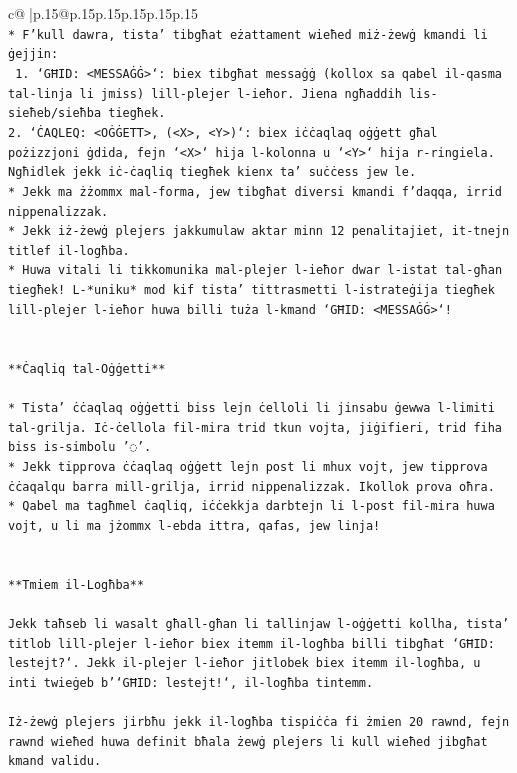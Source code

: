 \documentclass{article}
\begin{document}
{\begin{supertabular}{c@{$\;$}|p{.15\linewidth}@{}p{.15\linewidth}p{.15\linewidth}p{.15\linewidth}p{.15\linewidth}p{.15\linewidth}}
{{{\\ 
\texttt{* F'kull dawra, tista' tibgħat eżattament wieħed miż{-}żewġ kmandi li ġejjin:} \\
\texttt{ 1. `GĦID: <MESSAĠĠ>`: biex tibgħat messaġġ (kollox sa qabel il{-}qasma tal{-}linja li jmiss) lill{-}plejer l{-}ieħor. Jiena ngħaddih lis{-}sieħeb/sieħba tiegħek.} \\
\texttt{2. `ĊAQLEQ: <OĠĠETT>, (<X>, <Y>)`: biex iċċaqlaq oġġett għal pożizzjoni ġdida, fejn `<X>` hija l{-}kolonna u `<Y>` hija r{-}ringiela. Ngħidlek jekk iċ{-}ċaqliq tiegħek kienx ta' suċċess jew le.} \\
\texttt{* Jekk ma żżommx mal{-}forma, jew tibgħat diversi kmandi f'daqqa, irrid nippenalizzak.} \\
\texttt{* Jekk iż{-}żewġ plejers jakkumulaw aktar minn 12 penalitajiet, it{-}tnejn titlef il{-}logħba.} \\
\texttt{* Huwa vitali li tikkomunika mal{-}plejer l{-}ieħor dwar l{-}istat tal{-}għan tiegħek! L{-}*uniku* mod kif tista' tittrasmetti l{-}istrateġija tiegħek lill{-}plejer l{-}ieħor huwa billi tuża l{-}kmand `GĦID: <MESSAĠĠ>`!} \\
\\ 
\\ 
\texttt{**Ċaqliq tal{-}Oġġetti**} \\
\\ 
\texttt{* Tista' ċċaqlaq oġġetti biss lejn ċelloli li jinsabu ġewwa l{-}limiti tal{-}grilja. Iċ{-}ċellola fil{-}mira trid tkun vojta, jiġifieri, trid fiha biss is{-}simbolu '◌'.} \\
\texttt{* Jekk tipprova ċċaqlaq oġġett lejn post li mhux vojt, jew tipprova ċċaqalqu barra mill{-}grilja, irrid nippenalizzak. Ikollok prova oħra.} \\
\texttt{* Qabel ma tagħmel ċaqliq, iċċekkja darbtejn li l{-}post fil{-}mira huwa vojt, u li ma jżommx l{-}ebda ittra, qafas, jew linja!} \\
\\ 
\\ 
\texttt{**Tmiem il{-}Logħba**} \\
\\ 
\texttt{Jekk taħseb li wasalt għall{-}għan li tallinjaw l{-}oġġetti kollha, tista' titlob lill{-}plejer l{-}ieħor biex itemm il{-}logħba billi tibgħat `GĦID: lestejt?`. Jekk il{-}plejer l{-}ieħor jitlobek biex itemm il{-}logħba, u inti twieġeb b'`GĦID: lestejt!`, il{-}logħba tintemm.} \\
\\ 
\texttt{Iż{-}żewġ plejers jirbħu jekk il{-}logħba tispiċċa fi żmien 20 rawnd, fejn rawnd wieħed huwa definit bħala żewġ plejers li kull wieħed jibgħat kmand validu.} \\
}}}
\end{supertabular}}
\end{document}
